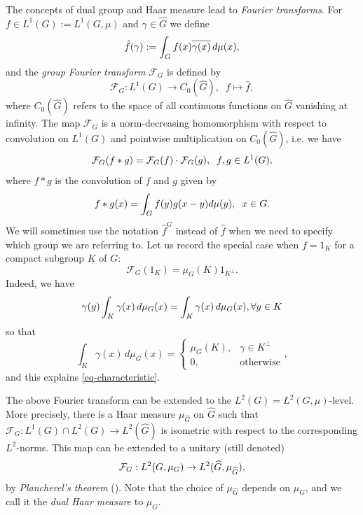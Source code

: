 \documentclass[12pt,reqno]{amsart}
\theoremstyle{definition}
\theoremstyle{definition}
\theoremstyle{definition}
\numberwithin{thm}{section}
\numberwithin{equation}{section}
\newcommand{\F}{\mathcal{F}}
\newcommand{\wh}[1]{\widehat{#1}}
\begin{document}
The concepts of dual group and Haar measure lead to {\em Fourier transforms}. For $f\in L^1(G):= L^1(G,\mu)$ and $\gamma\in \wh{G}$ we define
    \begin{equation} \notag
     \hat{f}(\gamma) := \int_G f(x)\overline{\gamma(x)}\, d\mu(x),   
    \end{equation}
    and the {\em group Fourier transform} $\F_G$ is defined by
    \begin{equation}\label{eq-group-Fourier}
        \F_G: L^1(G) \to C_0(\wh{G}),\;\; f\mapsto \hat{f},
    \end{equation}
where $C_0(\wh{G})$ refers to the space of all continuous functions on $\wh{G}$ vanishing at infinity. The map $\F_G$ is a norm-decreasing homomorphism with respect to convolution on $L^1(G)$ and pointwise multiplication on $C_0(\wh{G})$, i.e. we have
    \begin{equation} \notag
    \F_G(f*g) = \F_G(f) \cdot \F_G(g),\;\; f,g\in L^1(G),
    \end{equation}
where $f*g$ is the convolution of $f$ and $g$ given by
    \begin{equation} \notag
        f*g(x) = \int_G f(y)g(x-y)d\mu(y),\;\;x\in G.
    \end{equation}
    We will sometimes use the notation $\wh{f}^G$ instead of $\hat{f}$ when we need to specify which group we are referring to. Let us record the special case when $f = 1_K$ for a compact subgroup $K$ of $G$:
    \begin{equation}\label{eq-characteristic}
        \F_G(1_K) = \mu_G(K)1_{K^\perp}.
    \end{equation}
Indeed, we have
    \begin{equation} \notag
        \gamma(y)\int_K \gamma(x) \,d\mu_G(x) = \int_K \gamma(x) \,d\mu_G(x), \forall y\in K
    \end{equation}
so that
    \begin{equation}\label{eq-char-integral}
        \int_K \gamma(x) \,d\mu_G(x) = \begin{cases}\mu_G(K),& \gamma \in K^\perp\\ 0, & \text{otherwise}\end{cases},
    \end{equation}
and this explains \eqref{eq-characteristic}.

The above Fourier transform can be extended to the $L^2(G) = L^2(G,\mu)$-level. More precisely, there is a Haar measure $\mu_{\wh{G}}$ on $\wh{G}$ such that $\F_G: L^1(G)\cap L^2(G) \to L^2(\wh{G})$ is isometric with respect to the corresponding $L^2$-norms. This map can be extended to a unitary (still denoted)
    \begin{equation} \notag
        \F_G: L^2(G, \mu_G) \to L^2(\wh{G}, \mu_{\wh{G}}),
    \end{equation}
    by {\em Plancherel's theorem} (\cite[4.25]{Folland-book}). Note that the choice of $\mu_{\wh{G}}$ depends on $\mu_G$, and we call it the {\em dual Haar measure} to $\mu_G$.
\end{document}
